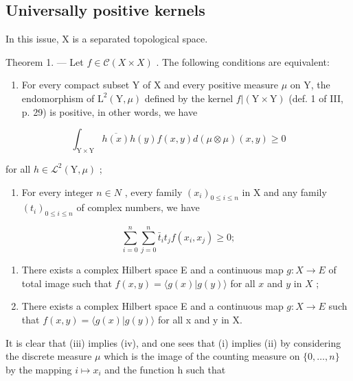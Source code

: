 \subsection{Universally positive kernels}

In this issue, X is a separated topological space.

Theorem 1. --- Let \(f \in \mathcal{C}(X \times X)\) . The following conditions are equivalent:

\begin{enumerate}
\def\labelenumi{(\roman{enumi})}
\tightlist
\item
  For every compact subset Y of X and every positive measure \(\mu\) on Y, the endomorphism of \(\mathrm{L}^{2}(\mathrm{Y},\mu)\) defined by the kernel \(f|(\mathrm{Y}\times\mathrm{Y})\) (def. 1 of III, p. 29) is positive, in other words, we have
\end{enumerate}

\[
\int_ {\mathrm{Y} \times \mathrm{Y}} \overline {{h (x)}} h (y) f (x, y) d (\mu \otimes \mu) (x, y) \geqslant 0
\]

for all \(h \in \mathcal{L}^{2}(\mathrm{Y}, \mu)\) ;

\begin{enumerate}
\def\labelenumi{(\roman{enumi})}
\setcounter{enumi}{1}
\tightlist
\item
  For every integer \(n \in N\) , every family \((x_{i})_{0 \leqslant i \leqslant n}\) in X and any family \((t_{i})_{0 \leqslant i \leqslant n}\) of complex numbers, we have
\end{enumerate}

\[
\sum_ {i = 0} ^ {n} \sum_ {j = 0} ^ {n} \bar {t} _ {i} t _ {j} f (x _ {i}, x _ {j}) \geqslant 0;
\]

\begin{enumerate}
\def\labelenumi{(\roman{enumi})}
\setcounter{enumi}{2}
\item
  There exists a complex Hilbert space E and a continuous map \(g \colon X \to E\) of total image such that \(f(x, y) = \langle g(x) | g(y) \rangle\) for all \(x\) and \(y\) in \(X\) ;
\item
  There exists a complex Hilbert space E and a continuous map \(g: X \to E\) such that \(f(x, y) = \langle g(x) | g(y) \rangle\) for all x and y in X.
\end{enumerate}

It is clear that (iii) implies (iv), and one sees that (i) implies (ii) by considering the discrete measure \(\mu\) which is the image of the counting measure on \(\{0,\ldots,n\}\) by the mapping \(i\mapsto x_{i}\) and the function h such that

